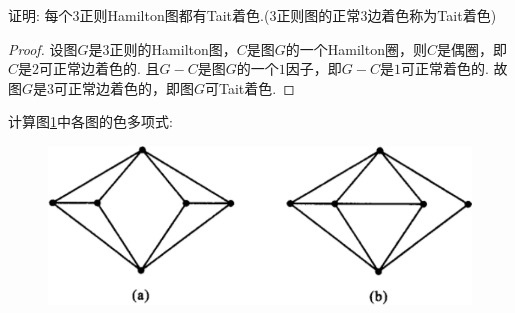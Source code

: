 \documentclass[cn,blue,normal,founder,11pt]{elegantnote}
\begin{document}
\begin{example}
	证明: 每个\(3\)正则Hamilton图都有Tait着色.(\(3\)正则图的正常\(3\)边着色称为Tait着色)
\end{example}

\begin{proof}
	设图\(G\)是\(3\)正则的Hamilton图，\(C\)是图\(G\)的一个Hamilton圈，则\(C\)是偶圈，即\(C\)是\(2\)可正常边着色的. 且\(G-C\)是图\(G\)的一个\(1\)因子，即\(G-C\)是\(1\)可正常着色的. 故图\(G\)是\(3\)可正常边着色的，即图\(G\)可Tait着色.
\end{proof}

\begin{example}\label{ex:28}
	计算图\ref{fig:7.28}中各图的色多项式:
	\begin{figure}[H]
		\centering
		\includegraphics[scale=0.60]{image/ex7.28.pdf}
		\caption{}
		\label{fig:7.28}
	\end{figure}
\end{example}
\end{document}
